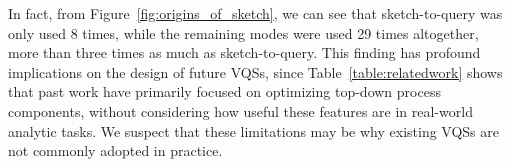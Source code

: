 In fact, from Figure~\ref{fig:origins_of_sketch},
we can see that sketch-to-query was only used 
8 times, while the remaining modes were used 29 times altogether,
more than three times as much as sketch-to-query.
This finding has profound implications 
on the design of future VQSs, since Table~\ref{table:relatedwork} 
shows that past work have primarily focused 
on optimizing top-down process components, 
without considering how useful these features 
are in real-world analytic tasks.
We suspect that these limitations 
may be why existing VQSs are not commonly adopted in practice. %

